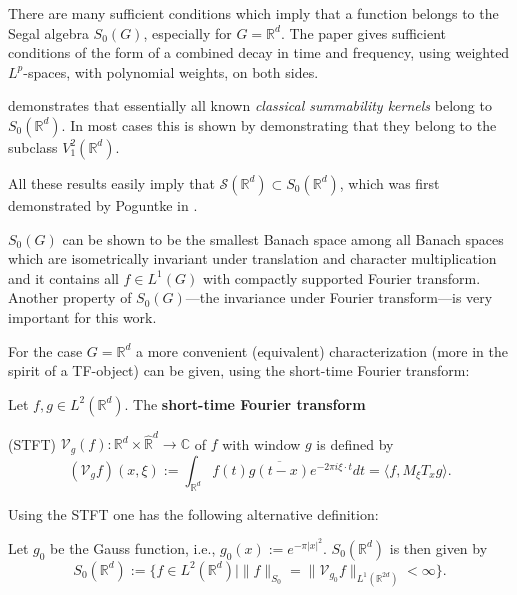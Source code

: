\documentclass[graybox]{svmult}
\begin{document}
There are many sufficient conditions which imply that a function
belongs to the Segal algebra ${S_{0}(G)}$, especially for $G = \mathbb{R}^d$.
The paper
\cite{gr96}
gives sufficient conditions of the form of a combined decay in time
and frequency, using weighted $L^p$-spaces, with polynomial
weights, on both sides.

\cite{fewe06} demonstrates that essentially all known
\textit{classical summability kernels}  belong to ${ S_0(\mathbb{R}^d)}$.
In most cases this is shown by demonstrating that they
belong to the subclass ${{V}}^2_1(\mathbb{R}^d)$.

All these results easily imply that
$\mathcal{S}(\mathbb{R}^d) \subset { S_0(\mathbb{R}^d)}$, which was first demonstrated by
Poguntke in \cite{po80-1}.

${S_{0}(G)}$ can be shown to be the smallest
Banach space among all Banach spaces which are isometrically
invariant under translation and character multiplication
and it contains all $f\in L^1(G)$ with compactly supported
Fourier transform. Another property of ${S_{0}(G)}$---the
invariance under Fourier transform---is
 very important for this work.

For the case $G =  \mathbb R^d$ a more convenient (equivalent)
characterization (more in the spirit of a TF-object) can be
given, using the short-time Fourier transform:

\begin{defin}
Let $f,g \in L^2(\mathbb R^d)$. The \textbf{short-time Fourier transform}

(STFT) $\mathcal{V}_g(f):
{\mathbb R^d}\times {\hat{\mathbb R}}^d\longrightarrow {\mathbb C}$
of $f$ with window $g$ is defined by
\begin{equation}\label{STFT}
(\mathcal{V}_gf)(x,\xi ):=\int_{\mathbb R^d}f(t){\overline{g(t-x)}}
e^{-2\pi i\xi \cdot t}dt = \langle f,M_\xi T_x g \rangle.
\end{equation}
\end{defin}
Using the STFT one has the following alternative definition:

\begin{defin}
Let $g_0$ be the Gauss function, i.e.,
$g_0(x):=e^{-\pi |x|^2}$.
$S_0(\mathbb R^d)$ is then given by
\begin{equation}\label{S0STFT}
S_0(\mathbb R^d):=\{f\in L^2(\mathbb R^d)\mid \|f\|_{S_0}=
\|\mathcal{V}_{g_0}f\|_{L^1(\mathbb R^{2d})}<\infty \}.
\end{equation}
\end{defin}
\end{document}
